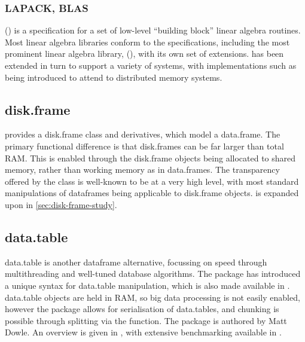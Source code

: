 \subsubsection{LAPACK, BLAS}\label{subsec:blas-lapack}

 () is a specification for a set of low-level ``building block'' linear
algebra routines\cite{lawson1979basic}.
Most linear algebra libraries conform to the  specifications, including the most prominent linear algebra library,  (), with its own set of extensions\cite{demmel1989lapack}.
 has been extended in turn to
support a variety of systems, with implementations such as 
being introduced to attend to distributed memory
systems\cite{choi1992scalapack}.

\subsection{disk.frame}\label{subsec:disk.frame}

 provides a disk.frame class and derivatives, which model a
data.frame.
The primary functional difference is that disk.frames can be far larger than total RAM.
This is enabled through the disk.frame objects being allocated to shared memory, rather than working memory as in data.frames.
The transparency offered by the class is well-known to be at a very high level, with most standard manipulations of dataframes being applicable to disk.frame objects.
 is expanded upon in \cref{sec:disk-frame-study}.

\subsection{data.table}\label{subsec:data.table}

data.table is another dataframe alternative, focussing on speed through
multithreading and well-tuned database algorithms\cite{dowle19}.
The package has introduced a unique syntax for data.table manipulation, which is also made available in .
data.table objects are held
in RAM, so big data processing is not easily enabled, however the
package allows for serialisation of data.tables, and chunking is
possible through splitting via the  function.
The package is authored by Matt Dowle.
An overview is given in \cite{dowle19:_introd}, with extensive benchmarking available in \cite{dowle19:_bench}.

